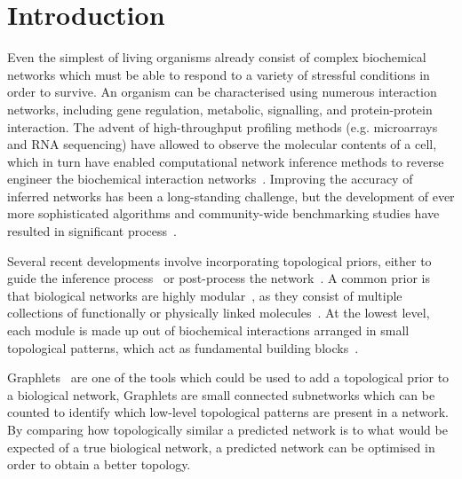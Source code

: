 \section*{Introduction}
Even the simplest of living organisms already consist of complex biochemical networks which must be able to respond to a variety of stressful conditions in order to survive. 
An organism can be characterised using numerous interaction networks, including gene regulation, metabolic, signalling, and protein-protein interaction. 
The advent of high-throughput profiling methods (e.g. microarrays and RNA sequencing) have allowed to observe the molecular contents of a cell, which in turn have enabled computational network inference methods to reverse engineer the biochemical interaction networks~\cite{albert_networkinferenceanalysis_2007}.
Improving the accuracy of inferred networks has been a long-standing challenge, but the development of ever more sophisticated algorithms and community-wide benchmarking studies have resulted in significant process~\cite{marbach_revealingstrengthsweaknesses_2010, narendra_comprehensiveassessmentmethods_2011, marbach_wisdomcrowdsrobust_2012, aijo_biophysicallymotivatedregulatory_2017}. 

Several recent developments involve incorporating topological priors, either to guide the inference process~\cite{lopes_featureselectiontechnique_2014} or post-process the network~\cite{ruyssinck_netterrerankinggene_2016}.
A common prior is that biological networks are highly modular~\cite{rives_modularorganizationcellular_2003}, as they consist of multiple collections of functionally or physically linked molecules~\cite{hartwell_molecularmodularcell_1999,barabasi_networkbiologyunderstanding_2004}. At the lowest level, each module is made up out of biochemical interactions arranged in small topological patterns, which act as fundamental building blocks~\cite{milo_networkmotifssimple_2002}.

Graphlets~\cite{przulj_modelinginteractomescalefree_2004} are one of the tools which could be used to add a topological prior to a biological network,
Graphlets are small connected subnetworks which can be counted to identify which low-level topological patterns are present in a network. By comparing how topologically similar a predicted network is to what would be expected of a true biological network, a predicted network can be optimised in order to obtain a better topology. 

